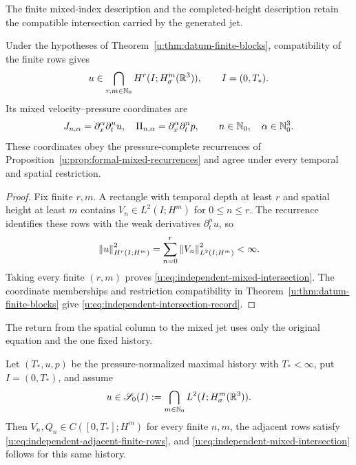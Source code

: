The finite mixed-index description and the completed-height description
retain the compatible intersection carried by the generated jet.

\begin{corollary}
\label{u:thm:datum-intersection}
Under the hypotheses of Theorem~\ref{u:thm:datum-finite-blocks}, compatibility
of the finite rows gives
\begin{equation}
 u\in\bigcap_{r,m\in\mathbb N_0}H^r(I;H^m_\sigma(\mathbb R^3)),
 \qquad I=(0,T_*).
 \label{u:eq:independent-mixed-intersection}
\end{equation}
Its mixed velocity--pressure coordinates are
\begin{equation}
 J_{n,\alpha}=\partial_x^\alpha\partial_t^nu,
 \quad
 \Pi_{n,\alpha}=\partial_x^\alpha\partial_t^np,
 \qquad n\in\mathbb N_0,\quad\alpha\in\mathbb N_0^3.
 \label{u:eq:independent-intersection-record}
\end{equation}
These coordinates obey the pressure-complete recurrences of
Proposition~\ref{u:prop:formal-mixed-recurrences} and agree under every
temporal and spatial restriction.
\end{corollary}

\begin{proof}
Fix finite \(r,m\).  A rectangle with temporal depth at least \(r\) and spatial
height at least \(m\) contains \(V_n\in L^2(I;H^m)\) for
\(0\le n\le r\).  The recurrence identifies these rows with the weak
derivatives \(\partial_t^nu\), so
\[
 \left\lVert u\right\rVert_{H^r(I;H^m)}^2
 =\sum_{n=0}^{r}\left\lVert V_n\right\rVert_{L^2(I;H^m)}^2<\infty.
\]
Taking every finite \((r,m)\) proves
\eqref{u:eq:independent-mixed-intersection}.  The coordinate memberships and
restriction compatibility in Theorem~\ref{u:thm:datum-finite-blocks} give
\eqref{u:eq:independent-intersection-record}.
\end{proof}

The return from the spatial column to the mixed jet uses only the original
equation and the one fixed history.

\begin{proposition}
\label{u:prop:spatial-column-reconstruction}
Let \((T_*,u,p)\) be the pressure-normalized maximal history with
\(T_*<\infty\), put \(I=(0,T_*)\), and assume
\begin{equation}
 u\in\mathscr S_0(I):=\bigcap_{m\in\mathbb N_0}L^2(I;H^m_\sigma(\mathbb R^3)).
 \label{u:eq:complete-spatial-row}
\end{equation}
Then \(V_n,Q_n\in C([0,T_*];H^m)\) for every finite \(n,m\), the adjacent
rows satisfy \eqref{u:eq:independent-adjacent-finite-rows}, and
\eqref{u:eq:independent-mixed-intersection} follows for this same history.
\end{proposition}

